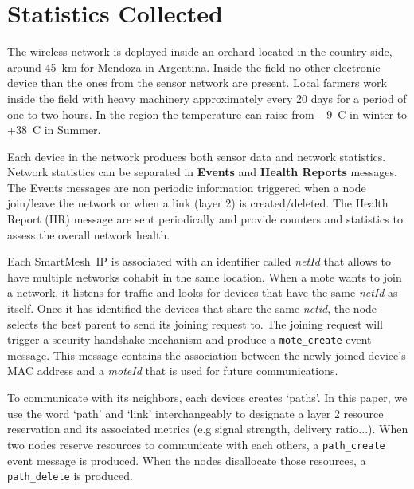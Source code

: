 \documentclass{sig-alternate}
\newcommand{\smip}                     {SmartMesh~IP\xspace}
\newcommand{\pathcreate}               {{\tt path\_create}\xspace}
\newcommand{\pathdelete}               {{\tt path\_delete}\xspace}
\newcommand{\motecreate}               {{\tt mote\_create}\xspace}
\begin{document}
\section{Statistics Collected}
\label{sec:collected}


The wireless network is deployed inside an orchard located in the country-side, around 45~km for Mendoza in Argentina.
Inside the field no other electronic device than the ones from the sensor network are present.
Local farmers work inside the field with heavy machinery approximately every 20 days for a period of one to two hours.
In the region the temperature can raise from $-9$~C in winter to +38~C in Summer.


Each device in the network produces both sensor data and network statistics.
Network statistics can be separated in \textbf{Events} and \textbf{Health Reports} messages.
The Events messages are non periodic information triggered when a node join/leave the network or when a link (layer 2) is created/deleted.
The Health Report (HR) message are sent periodically and provide counters and statistics to assess the overall network health.


Each \smip is associated with an identifier called \textit{netId} that allows to have multiple networks cohabit in the same location.
When a mote wants to join a network, it listens for traffic and looks for devices that have the same \textit{netId} as itself.
Once it has identified the devices that share the same \textit{netid}, the node selects the best parent to send its joining request to.
The joining request will trigger a security handshake mechanism and produce a \motecreate event message.
This message contains the association between the newly-joined device's MAC address and a \textit{moteId} that is used for future communications.


To communicate with its neighbors, each devices creates `paths'.
In this paper, we use the word `path' and `link' interchangeably to designate a layer 2 resource reservation and its associated metrics (e.g signal strength, delivery ratio...).
When two nodes reserve resources to communicate with each others, a \pathcreate event message is produced.
When the nodes disallocate those resources, a \pathdelete is produced.
\end{document}
